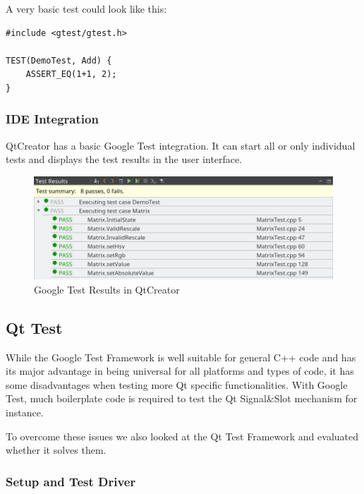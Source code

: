 \documentclass{scrreprt}
\begin{document}
A very basic test could look like this:

\bigskip
\begin{lstlisting}[title=tests-google/Demo.cpp]
#include <gtest/gtest.h>

TEST(DemoTest, Add) {
	ASSERT_EQ(1+1, 2);
}
\end{lstlisting}
\bigskip

\subsubsection{IDE Integration}

QtCreator has a basic Google Test integration. It can start all or only individual tests and displays the test results in the user interface.

\begin{figure}[h]
	\centering
	\includegraphics[width=1.0\textwidth]{img/qtcreator_test_results}
	\caption[QtCreator Google Test Results]{Google Test Results in QtCreator}
	\label{fig:qtcreator_test_results}
\end{figure}

\subsection{Qt Test}

While the Google Test Framework is well suitable for general C++ code and has its major advantage in being universal for all platforms and types of code, it has some disadvantages when testing more Qt specific functionalities. With Google Test, much boilerplate code is required to test the Qt Signal\&Slot mechanism for instance.

To overcome these issues we also looked at the Qt Test Framework and evaluated whether it solves them.

\subsubsection{Setup and Test Driver}
\end{document}
